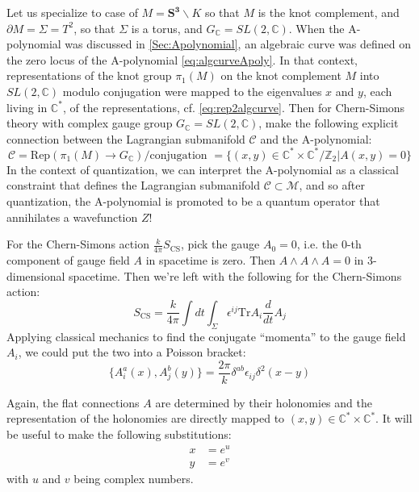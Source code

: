 \documentclass[a4paper,titlepage,twoside]{book}
\begin{document}
Let us specialize to case of $M = \mathbf{S^3}\backslash K$ so that $M$ is the knot complement, and $\partial M = \Sigma = T^2$, so that $\Sigma$ is a torus, and $G_{\mathbb{C}} = SL{(2,\mathbb{C})}$.  When the A-polynomial was discussed in \ref{Sec:Apolynomial}, an algebraic curve was defined on the zero locus of the A-polynomial \eqref{eq:algcurveApoly}.  In that context, representations of the knot group $\pi_1(M)$ on the knot complement $M$ into $SL{(2,\mathbb{C})}$ modulo conjugation were mapped to the eigenvalues $x$ and $y$, each living in $\mathbb{C}^*$, of the representations, cf. \eqref{eq:rep2algcurve}.  Then for Chern-Simons theory with complex gauge group $G_{\mathbb{C}}= SL{(2,\mathbb{C})}$, make the following explicit connection between the Lagrangian submanifold $\mathcal{C}$ and the A-polynomial:
\begin{equation}
\mathcal{C} = \text{Rep}{(\pi_1(M) \to G_{\mathbb{C}} )} / \text{conjugation } = \lbrace (x,y) \in \mathbb{C}^* \times \mathbb{C}^*/\mathbb{Z}_2 | A(x,y) = 0 \rbrace
\end{equation}
In the context of quantization, we can interpret the A-polynomial as a classical constraint that defines the Lagrangian submanifold $\mathcal{C} \subset \mathcal{M}$, and so after quantization, the A-polynomial is promoted to be a quantum operator that annihilates a wavefunction $Z$!

For the Chern-Simons action $\frac{k}{4\pi} S_{\text{CS}}$, pick the gauge $A_0 =0$, i.e. the $0$-th component of gauge field $A$ in spacetime is zero.  Then $A\wedge A \wedge A =0$ in 3-dimensional spacetime.  Then we're left with the following for the Chern-Simons action:
\begin{equation}
  S_{\text{CS}} = \frac{k}{4\pi} \int dt \int_{\Sigma} \epsilon^{ij} \text{Tr}{ A_i \frac{d}{dt}A_j }
\end{equation}
Applying classical mechanics to find the conjugate ``momenta'' to the gauge field $A_i$, we could put the two into a Poisson bracket:
\begin{equation}
  \lbrace A_i^a{(x)}, A_j^b{(y)} \rbrace = \frac{2\pi}{k} \delta^{ab} \epsilon_{ij} \delta^2{(x-y)} \label{eqn:CSPoissonb}
\end{equation}

Again, the flat connections $A$ are determined by their holonomies and the representation of the holonomies are directly mapped to $(x,y) \in \mathbb{C}^* \times \mathbb{C}^*$.  It will be useful to make the following substitutions:
\begin{equation}
\begin{aligned}
  x & = e^u \\ 
  y & = e^v
\end{aligned}  \label{eqn:xyreparam}
\end{equation}
with $u$ and $v$ being complex numbers.  
\end{document}

